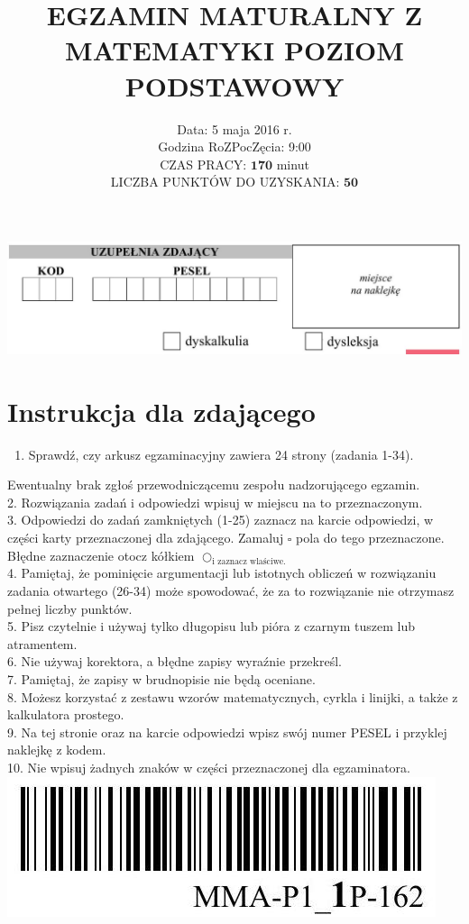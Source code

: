 \documentclass[10pt]{article}
\title{EGZAMIN MATURALNY Z MATEMATYKI POZIOM PODSTAWOWY }
\author{Data: 5 maja 2016 r.\\
Godzina RoZPocZęcia: 9:00\\
CZAS PRACY: \(\mathbf{1 7 0}\) minut\\
LICZBA PUNKTÓW DO UZYSKANIA: \(\mathbf{5 0}\)}
\date{}
\begin{document}
\maketitle
\begin{center}
\includegraphics[max width=\textwidth]{2024_11_21_1c92fcc0db78c9202015g-01(1)}
\end{center}



\section*{Instrukcja dla zdającego}
\begin{enumerate}
  \item Sprawdź, czy arkusz egzaminacyjny zawiera 24 strony (zadania 1-34).
\end{enumerate}

Ewentualny brak zgłoś przewodniczącemu zespołu nadzorującego egzamin.\\
2. Rozwiązania zadań i odpowiedzi wpisuj w miejscu na to przeznaczonym.\\
3. Odpowiedzi do zadań zamkniętych (1-25) zaznacz na karcie odpowiedzi, w części karty przeznaczonej dla zdającego. Zamaluj \(\square\) pola do tego przeznaczone. Błędne zaznaczenie otocz kółkiem \(\bigcirc_{\text {i zaznacz wlaściwe. }}\)\\
4. Pamiętaj, że pominięcie argumentacji lub istotnych obliczeń w rozwiązaniu zadania otwartego (26-34) może spowodować, że za to rozwiązanie nie otrzymasz pełnej liczby punktów.\\
5. Pisz czytelnie i używaj tylko długopisu lub pióra z czarnym tuszem lub atramentem.\\
6. Nie używaj korektora, a błędne zapisy wyraźnie przekreśl.\\
7. Pamiętaj, że zapisy w brudnopisie nie będą oceniane.\\
8. Możesz korzystać z zestawu wzorów matematycznych, cyrkla i linijki, a także z kalkulatora prostego.\\
9. Na tej stronie oraz na karcie odpowiedzi wpisz swój numer PESEL i przyklej naklejkę z kodem.\\
10. Nie wpisuj żadnych znaków w części przeznaczonej dla egzaminatora.\\
\includegraphics[max width=\textwidth, center]{2024_11_21_1c92fcc0db78c9202015g-01}
\end{document}
